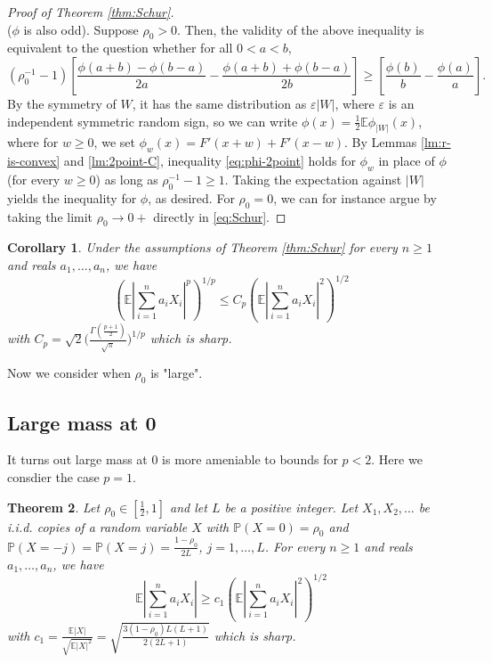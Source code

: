 \documentclass[10pt]{article}
\newcommand{\E}{\mathbb{E}}
\newcommand{\1}{\textbf{1}}
\newcommand{\p}[1]{\mathbb{P}\left( #1 \right)}
\newtheorem{theorem}{Theorem}[subsection]
\newtheorem{corollary}[theorem]{Corollary}
\theoremstyle{remark}
\theoremstyle{definition}
\begin{document}
\begin{proof}[Proof of Theorem \ref{thm:Schur}]
\[\]
($\phi$ is also odd). Suppose $\rho_0 > 0$. Then, the validity of the above inequality is equivalent to the question whether for all $0 < a < b$,
\begin{equation}\label{eq:phi-2point}
(\rho_0^{-1}-1)\left[\frac{\phi(a+b)-\phi(b-a)}{2a} - \frac{\phi(a+b)+\phi(b-a)}{2b}\right] \geq \left[ \frac{\phi(b)}{b}-\frac{\phi(a)}{a}\right].
\end{equation}
By the symmetry of $W$, it has the same distribution as $\varepsilon |W|$, where $\varepsilon$ is an independent symmetric random sign, so we can write $\phi(x) = \frac{1}{2}\E\phi_{|W|}(x)$, where for $w \geq 0$, we set $\phi_w(x) = F'(x+w) + F'(x-w)$. By Lemmas \ref{lm:r-is-convex} and \ref{lm:2point-C}, inequality \eqref{eq:phi-2point} holds for $\phi_w$ in place of $\phi$ (for every $w \geq 0$) as long as $\rho_0^{-1} - 1 \geq 1$. Taking the expectation against $|W|$ yields the inequality for $\phi$, as desired. For $\rho_0 =0$, we can for instance argue by taking the limit $\rho_0 \to 0+$ directly in \eqref{eq:Schur}.
\end{proof}

\begin{corollary}
Under the assumptions of Theorem \ref{thm:Schur} for every $n \geq 1$ and reals $a_1,\ldots,a_n$, we have
\begin{equation}\label{eq:2-p>3'}
\left(\E\left|\sum_{i=1}^n a_iX_i \right|^p\right)^{1/p} \leq C_p \left(\E\left|\sum_{i=1}^n a_iX_i \right|^2\right)^{1/2} 
\end{equation}
with $C_p = \sqrt{2} \Big(\frac{\Gamma (\frac{p+1}{2})}{\sqrt{\pi}} \Big)^{1/p}$ which is sharp.
\end{corollary}

Now we consider when $\rho_0$ is "large".

\subsection{Large mass at 0}

It turns out large mass at 0 is more ameniable to bounds for $p < 2$. Here we consdier the case $p=1$. 

\begin{theorem}\label{thm:L1-L2}
Let $\rho_0 \in [\frac{1}{2},1]$ and let $L$ be a positive integer. Let $X_1,X_2,\ldots$ be i.i.d. copies of a random variable $X$ with $\p{X = 0} = \rho_0$ and $\p{X = -j} = \p{X = j} = \frac{1-\rho_0}{2L}$, $j = 1, \ldots, L$. For every $n \geq 1$ and reals $a_1,\ldots,a_n$, we have
\begin{equation}\label{eq:L1-L2}
\E\left|\sum_{i=1}^n a_iX_i \right| \geq c_1\left(\E\left|\sum_{i=1}^n a_iX_i \right|^2\right)^{1/2} 
\end{equation}
with $c_1 = \frac{\E|X|}{\sqrt{\E|X|^2}} = \sqrt{\frac{3(1-\rho_0)L(L+1)}{2(2L+1)}}$ which is sharp.
\end{theorem}
\end{document}
